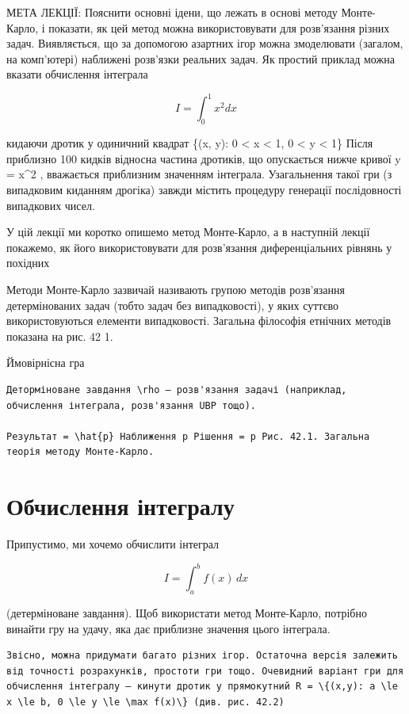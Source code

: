 \documentclass[
]{article}
\begin{document}
МЕТА ЛЕКЦІЇ: Пояснити основні ідени, що лежать в основі методу
Монте-Карло, і показати, як цей метод можна використовувати для
розв'язання різних задач. Виявляється, що за допомогою азартних ігор
можна змоделювати (загалом, на комп'ютері) наближені розв'язки реальних
задач. Як простий приклад можна вказати обчислення інтеграла

\[
I = \int_0^1 x^2 dx
\]

кидаючи дротик у одиничний квадрат \{(x, y): 0 \textless{} x \textless{}
1, 0 \textless{} y \textless{} 1\} Після приблизно 100 кидків відносна
частина дротиків, що опускається нижче кривої y = x\^{}2 , вважається
приблизним значенням інтеграла. Узагальнення такої гри (з випадковим
киданням дрогіка) завжди містить процедуру генерації послідовності
випадкових чисел.

У цій лекції ми коротко опишемо метод Монте-Карло, а в наступній лекції
покажемо, як його використовувати для розв'язання диференціальних
рівнянь у похідних

Методи Монте-Карло зазвичай називають групою методів розв'язання
детермінованих задач (тобто задач без випадковості), у яких суттєво
використовуються елементи випадковості. Загальна філософія етнічних
методів показана на рис. 42 1.

Ймовірнісна гра

\begin{verbatim}
Деторміноване завдання \rho — розв'язання задачі (наприклад, обчислення інтеграла, розв'язання UBP тощо).

Результат = \hat{p} Наближення p Рішення = p Рис. 42.1. Загальна теорія методу Монте-Карло.
\end{verbatim}

\section{Обчислення
інтегралу}\label{ux43eux431ux447ux438ux441ux43bux435ux43dux43dux44f-ux456ux43dux442ux435ux433ux440ux430ux43bux443}

Припустимо, ми хочемо обчислити інтеграл

\[
I = \int_{a}^{b} f(x) \, dx
\]

(детерміноване завдання). Щоб використати метод Монте-Карло, потрібно
винайти гру на удачу, яка дає приблизне значення цього інтеграла.

\begin{verbatim}
Звісно, можна придумати багато різних ігор. Остаточна версія залежить від точності розрахунків, простоти гри тощо. Очевидний варіант гри для обчислення інтегралу — кинути дротик у прямокутний R = \{(x,y): a \le x \le b, 0 \le y \le \max f(x)\} (див. рис. 42.2)
\end{verbatim}
\end{document}
